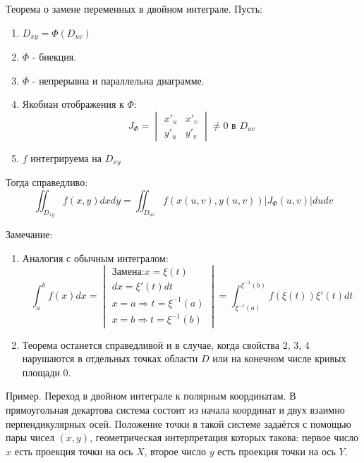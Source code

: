 \documentclass[a4paper, 12pt]{report}
\begin{document}
 	 	Теорема о замене переменных в двойном интеграле. Пусть:
	 	\begin{enumerate}
			\item $D_{xy}=\Phi(D_{uv})$
	 		\item $\Phi$ - биекция. 
	 		\item $\Phi$ - непрерывна и параллельна диаграмме.
	 		\item Якобиан отображения к $\Phi$:
	 		\begin{equation}
	 			J_\Phi=\begin{vmatrix}
	 				x'_u & x'_v \\
	 				y'_u & y'_v
	 			\end{vmatrix}\ne0\text{ в }D_{uv}
	 		\end{equation}
	 		\item $f$ интегрируема на $D_{xy}$
		\end{enumerate}
	 		
		Тогда справедливо:
		\begin{equation}
			\iint_{D_{xy}}f(x,y)dxdy
			=\iint_{D_{uv}}
				f(x(u,v),y(u,v))
				|J_\Phi(u,v)|
			dudv
		\end{equation}
	
 		Замечание:
 		\begin{enumerate}
 			\item Аналогия с обычным интегралом:
 			\begin{equation}
 				\int_a^bf(x)dx=
 				\begin{vmatrix}
 					\text{Замена:} x=\xi(t) \\
 					dx=\xi'(t)dt \\
 					x=a\Rightarrow t=\xi^{-1}(a) \\
 					x=b\Rightarrow t=\xi^{-1}(b)
 				\end{vmatrix}
					=\int_{\xi^{-1}(a)}^{\xi^{-1}(b)}f(\xi(t))\xi'(t)dt
 			\end{equation}
				\item Теорема останется справедливой и в случае, когда свойства 2, 3, 4 нарушаются в отдельных точках области $D$ или на конечном числе кривых площади 0.
 		\end{enumerate}
		
		Пример. Переход в двойном интеграле к полярным координатам. В прямоугольная декартова система состоит из начала координат и двух взаимно перпендикулярных осей. Положение точки в такой системе задаётся с помощью пары чисел $(x, y)$, геометрическая интерпретация которых такова: первое число $x$ есть проекция точки на ось $X$, второе число $y$ есть проекция точки на ось $Y$.
			
\end{document}
